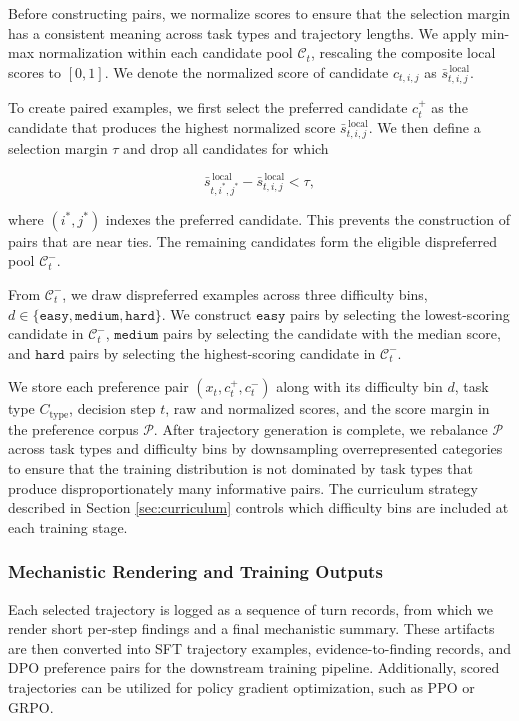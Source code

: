 \documentclass[thesis,letterpaper,12pt]{utthesis}
\begin{document}
Before constructing pairs, we normalize scores to ensure that the selection margin has a consistent meaning across task types and trajectory lengths. We apply min-max normalization within each candidate pool $\mathcal{C}_t$, rescaling the composite local scores to $[0, 1]$. We denote the normalized score of candidate $c_{t,i,j}$ as $\bar{s}^{\,\text{local}}_{t,i,j}$.

To create paired examples, we first select the preferred candidate $c_t^+$ as the candidate that produces the highest normalized score $\bar{s}^{\,\text{local}}_{t,i,j}$. We then define a selection margin $\tau$ and drop all candidates for which

\[
    \bar{s}^{\,\text{local}}_{t,i^*,j^*} - \bar{s}^{\,\text{local}}_{t,i,j} < \tau,
\]

where $(i^*, j^*)$ indexes the preferred candidate. This prevents the construction of pairs that are near ties. The remaining candidates form the eligible dispreferred pool $\mathcal{C}_t^{-}$.

From $\mathcal{C}_t^{-}$, we draw dispreferred examples across three difficulty bins, $d \in \{\texttt{easy}, \texttt{medium}, \texttt{hard}\}$. We construct $\texttt{easy}$ pairs by selecting the lowest-scoring candidate in $\mathcal{C}_t^{-}$, $\texttt{medium}$ pairs by selecting the candidate with the median score, and $\texttt{hard}$ pairs by selecting the highest-scoring candidate in $\mathcal{C}_t^{-}$.

We store each preference pair $(x_t, c_t^+, c_t^-)$ along with its difficulty bin $d$, task type $C_{\text{type}}$, decision step $t$, raw and normalized scores, and the score margin in the preference corpus $\mathcal{P}$. After trajectory generation is complete, we rebalance $\mathcal{P}$ across task types and difficulty bins by downsampling overrepresented categories to ensure that the training distribution is not dominated by task types that produce disproportionately many informative pairs. The curriculum strategy described in Section \ref{sec:curriculum} controls which difficulty bins are included at each training stage.

\subsubsection{Mechanistic Rendering and Training Outputs}
Each selected trajectory is logged as a sequence of turn records, from which we render short per-step findings and a final mechanistic summary. These artifacts are then converted into SFT trajectory examples, evidence-to-finding records, and DPO preference pairs for the downstream training pipeline. Additionally, scored trajectories can be utilized for policy gradient optimization, such as PPO or GRPO.
\end{document}

